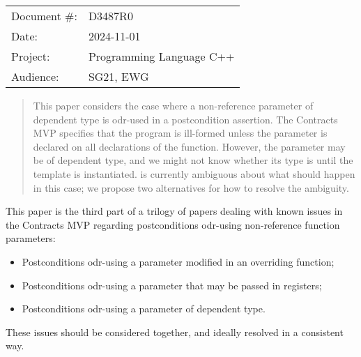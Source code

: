 \begin{tabular}{ll}
Document \#: & D3487R0 \\
Date: &2024-11-01 \\
Project: & Programming Language C++ \\
Audience: & SG21, EWG
\end{tabular}

\begin{abstract}
This paper considers the case where a non-reference parameter of dependent type is odr-used in a postcondition assertion. The Contracts MVP \cite{P2900R10} specifies that the program is ill-formed unless the parameter is declared  on all declarations of the function. However, the parameter may be of dependent type, and we might not know whether its type is  until the template is instantiated. \cite{P2900R10} is currently ambiguous about what should happen in this case; we propose two alternatives for how to resolve the ambiguity.
\end{abstract}







This paper is the third part of a trilogy of papers dealing with known issues in the Contracts MVP \cite{P2900R10} regarding postconditions odr-using non-reference function parameters:
\begin{itemize}
\item \cite{D3484R1} Postconditions odr-using a parameter modified in an overriding function;
\item \cite{D3487R0} Postconditions odr-using a parameter that may be passed in registers;
\item \cite{D3489R0} Postconditions odr-using a parameter of dependent type.
\end{itemize}
These issues should be considered together, and ideally resolved in a consistent way.

